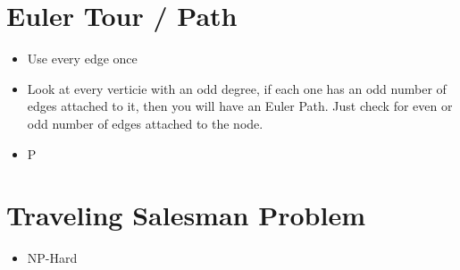 \documentclass{article}
\begin{document}
\section{Euler Tour / Path}
\label{sec:org1375800}
\begin{itemize}
\item Use every edge once
\item Look at every verticie with an odd degree, if each one has an odd number of edges attached to it, then you will have an Euler Path. Just check for even or odd number of edges attached to the node.
\item P
\end{itemize}

\section{Traveling Salesman Problem}
\label{sec:orgbcc2c91}
\begin{itemize}
\item NP-Hard
\end{itemize}
\end{document}
